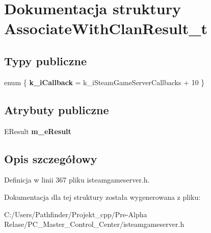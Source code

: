 \hypertarget{struct_associate_with_clan_result__t}{}\section{Dokumentacja struktury Associate\+With\+Clan\+Result\+\_\+t}
\label{struct_associate_with_clan_result__t}
\subsection*{Typy publiczne}
\begin{DoxyCompactItemize}
\item 
\mbox{\label{struct_associate_with_clan_result__t_acbd74671675b8fa1c16de38b7d7e98bd}} 
enum \{ {\bfseries k\+\_\+i\+Callback} = k\+\_\+i\+Steam\+Game\+Server\+Callbacks + 10
 \}
\end{DoxyCompactItemize}
\subsection*{Atrybuty publiczne}
\begin{DoxyCompactItemize}
\item 
\mbox{\label{struct_associate_with_clan_result__t_a116dc2bc6c48e050fb88a8a9c1c545b3}} 
E\+Result {\bfseries m\+\_\+e\+Result}
\end{DoxyCompactItemize}


\subsection{Opis szczegółowy}


Definicja w linii 367 pliku isteamgameserver.\+h.



Dokumentacja dla tej struktury została wygenerowana z pliku\+:\begin{DoxyCompactItemize}
\item 
C\+:/\+Users/\+Pathfinder/\+Projekt\+\_\+cpp/\+Pre-\/\+Alpha Relase/\+P\+C\+\_\+\+Master\+\_\+\+Control\+\_\+\+Center/isteamgameserver.\+h\end{DoxyCompactItemize}
